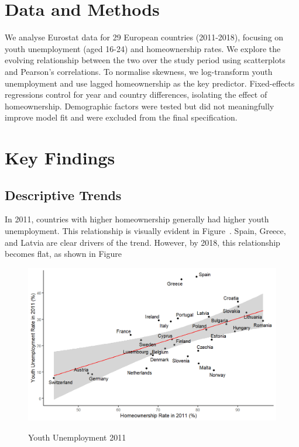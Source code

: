 \documentclass[11pt]{article}
\begin{document}
\begin{multicols}{2}
		\vspace{-1em}
		
		\section*{Data and Methods}
		\indent We analyse Eurostat data for 29 European countries (2011-2018), focusing on youth unemployment (aged 16-24) and homeownership rates. We explore the evolving relationship between the two over the study period using scatterplots and Pearson's correlations. To normalise skewness, we log-transform youth unemployment and use lagged homeownership as the key predictor. Fixed-effects regressions control for year and country differences, isolating the effect of homeownership. Demographic factors were tested but did not meaningfully improve model fit and were excluded from the final specification.
		
		\vspace{-1em}
		
		\section*{Key Findings}
		
		\subsection*{Descriptive Trends}
		\indent In 2011, countries with higher homeownership generally had higher youth unemployment. This relationship is visually evident in Figure~. Spain, Greece, and Latvia are clear drivers of the trend. However, by 2018, this relationship becomes flat, as shown in Figure
		
		\begin{figure}[H]
			\centering
			\caption{Youth Unemployment 2011}
			\includegraphics[width=1\linewidth]{youth_unemployment_2011.png}
			\label{fig:youth_unemployment_2011}
		\end{figure}
		

\end{multicols}
\end{document}
